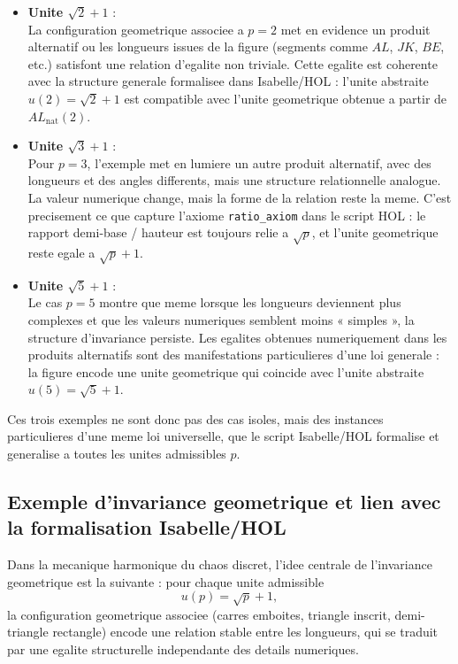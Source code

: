 \documentclass[12pt,a4paper]{article}
\theoremstyle{definition}
\theoremstyle{remark}
\begin{document}
\begin{itemize}
  \item \textbf{Unite $\sqrt{2} + 1$} :\\
  La configuration geometrique associee a $p = 2$ met en evidence un produit
  alternatif ou les longueurs issues de la figure (segments comme $AL$, $JK$,
  $BE$, etc.) satisfont une relation d'egalite non triviale. Cette egalite
  est coherente avec la structure generale formalisee dans Isabelle/HOL :
  l'unite abstraite $u(2) = \sqrt{2} + 1$ est compatible avec l'unite
  geometrique obtenue a partir de $AL_{\text{nat}}(2)$.

  \item \textbf{Unite $\sqrt{3} + 1$} :\\
  Pour $p = 3$, l'exemple met en lumiere un autre produit alternatif, avec
  des longueurs et des angles differents, mais une structure relationnelle
  analogue. La valeur numerique change, mais la forme de la relation reste
  la meme. C'est precisement ce que capture l'axiome
  \texttt{ratio\_axiom} dans le script HOL : le rapport demi-base / hauteur
  est toujours relie a $\sqrt{p}$, et l'unite geometrique reste egale a
  $\sqrt{p} + 1$.

  \item \textbf{Unite $\sqrt{5} + 1$} :\\
  Le cas $p = 5$ montre que meme lorsque les longueurs deviennent plus
  complexes et que les valeurs numeriques semblent moins « simples », la
  structure d'invariance persiste. Les egalites obtenues numeriquement
  dans les produits alternatifs sont des manifestations particulieres
  d'une loi generale : la figure encode une unite geometrique qui coincide
  avec l'unite abstraite $u(5) = \sqrt{5} + 1$.
\end{itemize}

Ces trois exemples ne sont donc pas des cas isoles, mais des instances
particulieres d'une meme loi universelle, que le script Isabelle/HOL
formalise et generalise a toutes les unites admissibles $p$.

\subsection{Exemple d'invariance geometrique et lien avec la formalisation Isabelle/HOL}

Dans la mecanique harmonique du chaos discret, l'idee centrale de l'invariance
geometrique est la suivante : pour chaque unite admissible
\[
  u(p) = \sqrt{p} + 1,
\]
la configuration geometrique associee (carres emboites, triangle inscrit,
demi-triangle rectangle) encode une relation stable entre les longueurs, qui
se traduit par une egalite structurelle independante des details numeriques.
\end{document}
